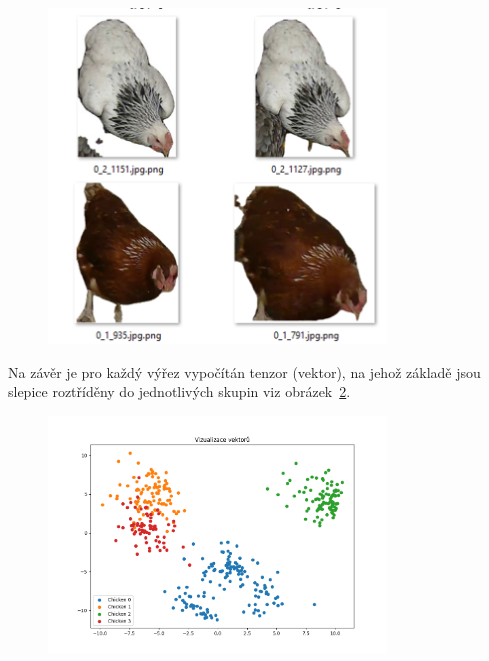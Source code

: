 \begin{figure}[H]
    \centering
    \includegraphics[width=0.8\textwidth]{img/segmented_chicks}
    \label{fig:segmented_chicks2}
\end{figure}

Na závěr je pro každý výřez vypočítán tenzor (vektor), na jehož základě jsou slepice roztříděny do jednotlivých skupin viz obrázek~\ref{fig:chicks_in_clusters}.

\begin{figure}[H]
    \centering
    \includegraphics[width=0.8\textwidth]{img/chicks_in_clusters}
    \label{fig:chicks_in_clusters}
\end{figure}

